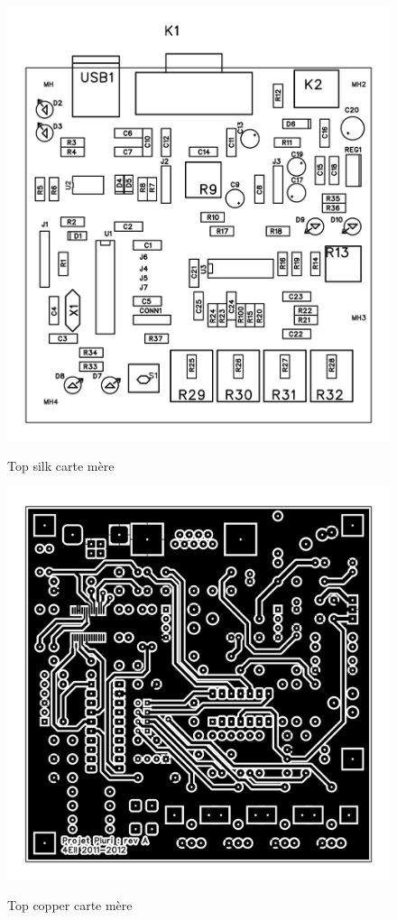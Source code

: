 \documentclass[11pt, french]{article} %
\begin{document}
\begin{figure}[!h]
	\centering
	\includegraphics[width=15cm]{SolutionAnalogique/top_silk.png}
	\label{cout}
	\caption{Top silk carte mère}
\end{figure}

\begin{figure}[!h]
	\centering
	\includegraphics[width=15cm]{SolutionAnalogique/top_copper.png}
	\label{cout}
	\caption{Top copper carte mère}
\end{figure}
\end{document}
